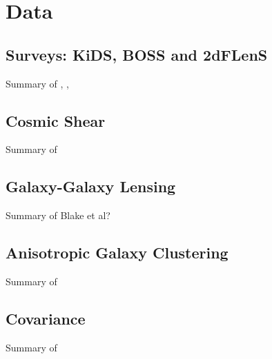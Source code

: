 \section{Data}
\label{sec:data}

\subsection{Surveys:  KiDS, BOSS and 2dFLenS}
\label{sec:surveys}
Summary of \citet{kuijken/etal:2019},  \citet{blake/etal:2016}, \citet{alam/etal:2015}

\subsection{Cosmic Shear}
\label{sec:cosmic_shear}
Summary of \citet{asgari/etal:inprep}

\subsection{Galaxy-Galaxy Lensing}
\label{sec:GGL}
Summary of Blake et al?

\subsection{Anisotropic Galaxy Clustering}
\label{sec:clustering}
Summary of \citet{sanchez/etal:2017}

\subsection{Covariance}
\label{sec:Cov}
Summary of \citet{joachimi/etal:inprep}

